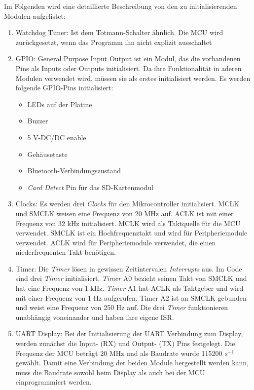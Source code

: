 Im Folgenden wird eine detaillierte Beschreibung von den zu initialisierenden Modulen aufgelistet:
\begin{enumerate}
    \item Watchdog Timer: Ist dem Totmann-Schalter ähnlich. Die MCU wird zurückgesetzt, wenn das Programm ihn nicht explizit ausschaltet
    \item GPIO: General Purpose Input Output ist ein Modul, das die vorhandenen Pins als Inputs oder Outputs initialisiert. Da ihre Funktionalität in aderen Modulen verwendet wird, müssen sie als erstes initialisiert werden. Es werden folgende GPIO-Pins initialisiert:
    \begin{itemize}
        \item LEDs auf der Platine
        \item Buzzer
        \item 5 V-DC/DC enable
        \item Gehäusetaste
        \item Bluetooth-Verbindungszustand
        \item \textit{Card Detect} Pin für das SD-Kartenmodul
    \end{itemize}
    \item Clocks: Es werden drei \textit{Clocks}  für den Mikrocontroller initialisiert. MCLK und SMCLK weisen eine Frequenz von 20 MHz auf. ACLK ist mit einer Frequenz von 32 kHz initialisiert.
    MCLK wird als Taktquelle für die MCU verwendet. SMCLK ist ein Hochfrequenztakt und wird für Peripheriemodule verwendet. ACLK wird für Peripheriemodule verwendet, die einen niederfrequenten Takt benötigen.
    \item Timer: Die \textit{Timer} lösen in gewissen Zeitintervalen \textit{Interrupts} aus. Im Code sind drei \textit{Timer} initialisiert. \textit{Timer} A0 bezieht seinen Takt von SMCLK und hat eine Frequenz von 1 kHz. \textit{Timer} A1 hat ACLK als Taktgeber und wird mit einer Frequenz von 1 Hz aufgerufen. Timer A2 ist an SMCLK gebunden und weist eine Frequenz von 250 Hz auf. Die drei \textit{Timer} funktionieren unabhängig voneinander und haben ihre eigene ISR.
    \item UART Display: Bei der Initialisierung der UART Verbindung zum Display, werden zunächst die Input- (RX) und Output- (TX) Pins festgelegt. Die Frequenz der MCU beträgt 20 MHz und als Baudrate wurde 115200 $s^{-1}$ gewählt. Damit eine Verbindung der beiden Module hergestellt werden kann, muss die Baudrate sowohl beim Display als auch bei der MCU einprogrammiert werden.\\

\end{enumerate}
